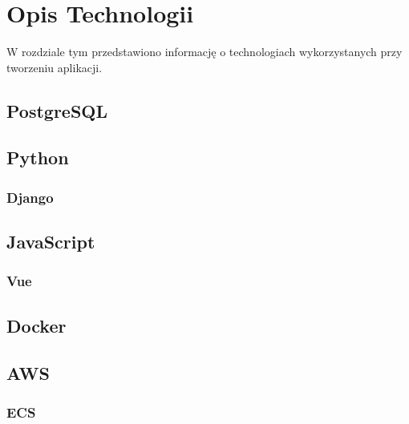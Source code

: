 \chapter{Opis Technologii}
\label{cha:Tech}

W rozdziale tym przedstawiono informację o technologiach wykorzystanych przy tworzeniu aplikacji.


\section{PostgreSQL}
\label{sec:PSQL}



\section{Python}
\label{sec:Python}

\subsection{Django}


\section{JavaScript}
\label{sec:JS}

\subsection{Vue}


\section{Docker}
\label{sec:Docker}



\section{AWS}
\label{sec:AWS}

\subsection{ECS}